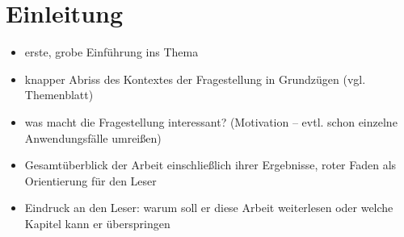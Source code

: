 \chapter{Einleitung}

\begin{itemize}
	\item erste, grobe Einführung ins Thema
	\item knapper Abriss des Kontextes der Fragestellung in Grundzügen (vgl. Themenblatt)
	\item was macht die Fragestellung interessant? (Motivation -- evtl. schon einzelne Anwendungsfälle umreißen)
	\item Gesamtüberblick der Arbeit einschließlich ihrer Ergebnisse, roter Faden als Orientierung für den Leser
	\item Eindruck an den Leser: warum soll er diese Arbeit weiterlesen oder welche Kapitel kann er überspringen
\end{itemize}


